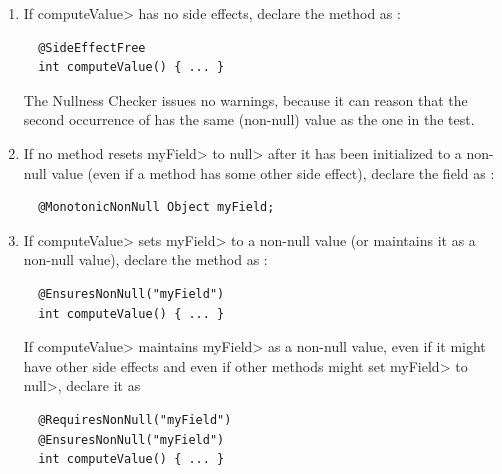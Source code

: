 \begin{enumerate}
\item
  If \<computeValue> has no side effects, declare the method as
  :

\begin{Verbatim}
  @SideEffectFree
  int computeValue() { ... }
\end{Verbatim}

\noindent
The Nullness Checker issues no warnings, because it can reason that
the second occurrence of  has the same (non-null) value as
the one in the test.

\item
  If no method resets \<myField> to \<null> after it has been initialized
  to a non-null value (even if a method has some other side effect),
  declare the field as :

\begin{Verbatim}
  @MonotonicNonNull Object myField;
\end{Verbatim}

\item
  If \<computeValue> sets \<myField> to a non-null value (or maintains it
  as a non-null value), declare the method as
  :

\begin{Verbatim}
  @EnsuresNonNull("myField")
  int computeValue() { ... }
\end{Verbatim}

  If \<computeValue> maintains \<myField> as a non-null value, even if it
  might have other side effects and even if other methods might set
  \<myField> to \<null>, declare it as

\begin{Verbatim}
  @RequiresNonNull("myField")
  @EnsuresNonNull("myField")
  int computeValue() { ... }
\end{Verbatim}
\end{enumerate}

